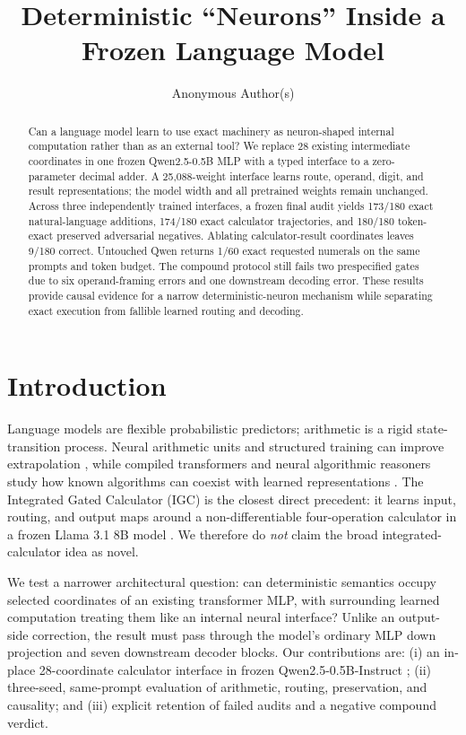 \documentclass{article}
\title{Deterministic ``Neurons'' Inside a Frozen Language Model}
\author{Anonymous Author(s)}
\begin{document}
\maketitle

\begin{abstract}
Can a language model learn to use exact machinery as neuron-shaped internal
computation rather than as an external tool? We replace 28 existing
intermediate coordinates in one frozen Qwen2.5-0.5B MLP with a typed interface
to a zero-parameter decimal adder. A 25,088-weight interface learns route,
operand, digit, and result representations; the model width and all pretrained
weights remain unchanged. Across three independently trained interfaces, a
frozen final audit yields 173/180 exact natural-language additions, 174/180
exact calculator trajectories, and 180/180 token-exact preserved adversarial
negatives. Ablating calculator-result coordinates leaves 9/180 correct.
Untouched Qwen returns 1/60 exact requested numerals on the same prompts and
token budget. The compound protocol still fails two prespecified gates due to
six operand-framing errors and one downstream decoding error. These results
provide causal evidence for a narrow deterministic-neuron mechanism while
separating exact execution from fallible learned routing and decoding.
\end{abstract}

\section{Introduction}

Language models are flexible probabilistic predictors; arithmetic is a rigid
state-transition process. Neural arithmetic units and structured training can
improve extrapolation \citep{trask2018,jelassi2023,cho2024}, while compiled
transformers and neural algorithmic reasoners study how known algorithms can
coexist with learned representations \citep{lindner2023,bounsi2024}. The
Integrated Gated Calculator (IGC) is the closest direct precedent: it learns
input, routing, and output maps around a non-differentiable four-operation
calculator in a frozen Llama 3.1 8B model \citep{dietz2025}. We therefore do
\emph{not} claim the broad integrated-calculator idea as novel.

We test a narrower architectural question: can deterministic semantics occupy
selected coordinates of an existing transformer MLP, with surrounding learned
computation treating them like an internal neural interface? Unlike an
output-side correction, the result must pass through the model's ordinary MLP
down projection and seven downstream decoder blocks. Our contributions are:
(i) an in-place 28-coordinate calculator interface in frozen
Qwen2.5-0.5B-Instruct \citep{qwen2024}; (ii) three-seed, same-prompt evaluation
of arithmetic, routing, preservation, and causality; and (iii) explicit
retention of failed audits and a negative compound verdict.
\end{document}
